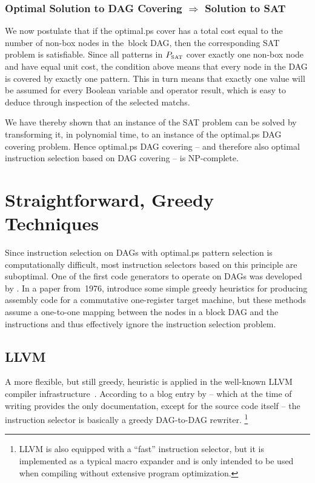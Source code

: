 \subsubsection{Optimal Solution to DAG Covering $\Rightarrow$ Solution to SAT}

We now postulate that if the \gls{optimal.ps} cover has a total cost equal to
the number of non-\glspl{box node} in the~\gls{block DAG}, then the
corresponding \gls{SAT} problem is satisfiable.
%
Since all \glspl{pattern} in $\mPSat$ cover exactly one non-\gls{box node} and
have equal unit cost, the condition above means that every \gls{node} in the
\gls{DAG} is covered by exactly one \gls{pattern}.
%
This in turn means that exactly one value will be assumed for every Boolean
variable and operator result, which is easy to deduce through inspection of the
selected \glspl{match}.

We have thereby shown that an instance of the \gls{SAT} problem can be solved by
transforming it, in polynomial time, to an instance of the \gls{optimal.ps}
\gls{DAG covering} problem.
%
Hence \gls{optimal.ps} \gls{DAG covering} -- and therefore also optimal
\gls{instruction selection} based on \gls{DAG covering} -- is NP-complete.
%
\hfill\qedsymbol


\section{Straightforward, Greedy Techniques}

Since \gls{instruction selection} on \glspl{DAG} with \gls{optimal.ps}
\gls{pattern selection} is computationally difficult, most \glspl{instruction
  selector} based on this \gls{principle} are suboptimal.
%
One of the first \glspl{code generator} to operate on \glspl{DAG} was developed
by \textcite{AhoEtAl:1976}.
%
In a paper from~1976, \citeauthor{AhoEtAl:1976} introduce some simple greedy
heuristics for producing \gls{assembly code} for a commutative
one-\gls{register} \gls{target machine}, but these methods assume a one-to-one
mapping between the \glspl{node} in a \gls{block DAG} and the
\glspl{instruction} and thus effectively ignore the \gls{instruction selection}
problem.


\subsection{LLVM}

A more flexible, but still greedy, heuristic is applied in the well-known
\gls{LLVM} \gls{compiler} infrastructure~\cite{LattnerAdve:2004}.
%
According to a blog entry by \textcite{Bendersky:2013} -- which at the time of
writing provides the only documentation, except for the source code itself --
the \gls{instruction selector} is basically a greedy
\mbox{\gls{DAG}-to-\gls{DAG}} rewriter.\!%
%
\footnote{%
  \gls{LLVM} is also equipped with a ``fast'' \gls{instruction selector}, but it
  is implemented as a typical \gls{macro expander} and is only intended to be
  used when compiling without extensive \gls{program} optimization.%
}

